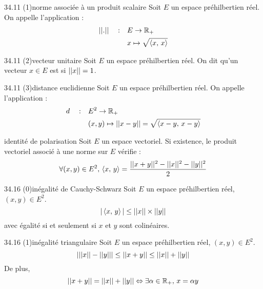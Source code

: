 

\begin{adjustwidth}{-3cm}{-3cm}


\begin{definition}{34.11 (1)}{norme associée à un produit scalaire}
    Soit $E$ un espace préhilbertien réel. On appelle  l'application :
    \begin{align*}
        ||.||\quad:\quad&E \to \mathbb{R}_+ \\
        &x \mapsto \sqrt{\left\langle x ,\, x \right\rangle}
    \end{align*}
    
\end{definition}

\begin{definition}{34.11 (2)}{vecteur unitaire}
    Soit $E$ un espace préhilbertien réel. On dit qu'un vecteur $x \in E$ est  si $||x|| = 1$. 
    
\end{definition}

\begin{definition}{34.11 (3)}{distance euclidienne}
    Soit $E$ un espace préhilbertien réel. On appelle  l'application :
    \begin{align*}
        d\quad:\quad&E^2 \to \mathbb{R}_+ \\
        &(x,y) \mapsto ||x-y|| = \sqrt{\left\langle x-y ,\, x-y \right\rangle}
    \end{align*}
\end{definition}

\begin{proposition}{34.15}{identité de polarisation}
    Soit $E$ un espace vectoriel. Si existence, le produit vectoriel associé à une norme sur $E$ vérifie :\\
    $$\forall (x,y) \in E^2,\, \left\langle x ,\, y \right\rangle = \frac{||x+y||^2 - ||x||^2 - ||y||^2}{2}$$
\end{proposition}

\begin{theoreme}{34.16 (0)}{inégalité de Cauchy-Schwarz}
    Soit $E$ un espace préhilbertien réel, $(x,y) \in E^2$.
    $$|\left\langle x ,\, y \right\rangle| \leq ||x|| \times ||y||$$
    avec égalité si et seulement si $x$ et $y$ sont colinéaires.
\end{theoreme}

\begin{theoreme}{34.16 (1)}{inégalité triangulaire}
    Soit $E$ un espace préhilbertien réel, $(x,y) \in E^2$.
    $$|||x||-{||y||}| \leq ||x+y|| \leq ||x|| + ||y||$$
    De plus, 
    $$||x+y|| = ||x|| + ||y|| \Leftrightarrow \exists \alpha \in \mathbb{R}_+, \,x = \alpha y$$
\end{theoreme}


\end{adjustwidth}
